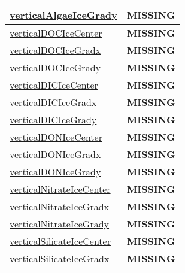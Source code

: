 {\begin{center}
\begin{longtable}{| p{2.0in} | p{4.0in} |}
    \hline
    \hyperref[subsec:var_sec_tracer_reconstruction_verticalAlgaeIceGrady]{verticalAlgaeIceGrady} & {\bf \color{red} MISSING} \\
    \hline
    \hyperref[subsec:var_sec_tracer_reconstruction_verticalDOCIceCenter]{verticalDOCIceCenter} & {\bf \color{red} MISSING} \\
    \hline
    \hyperref[subsec:var_sec_tracer_reconstruction_verticalDOCIceGradx]{verticalDOCIceGradx} & {\bf \color{red} MISSING} \\
    \hline
    \hyperref[subsec:var_sec_tracer_reconstruction_verticalDOCIceGrady]{verticalDOCIceGrady} & {\bf \color{red} MISSING} \\
    \hline
    \hyperref[subsec:var_sec_tracer_reconstruction_verticalDICIceCenter]{verticalDICIceCenter} & {\bf \color{red} MISSING} \\
    \hline
    \hyperref[subsec:var_sec_tracer_reconstruction_verticalDICIceGradx]{verticalDICIceGradx} & {\bf \color{red} MISSING} \\
    \hline
    \hyperref[subsec:var_sec_tracer_reconstruction_verticalDICIceGrady]{verticalDICIceGrady} & {\bf \color{red} MISSING} \\
    \hline
    \hyperref[subsec:var_sec_tracer_reconstruction_verticalDONIceCenter]{verticalDONIceCenter} & {\bf \color{red} MISSING} \\
    \hline
    \hyperref[subsec:var_sec_tracer_reconstruction_verticalDONIceGradx]{verticalDONIceGradx} & {\bf \color{red} MISSING} \\
    \hline
    \hyperref[subsec:var_sec_tracer_reconstruction_verticalDONIceGrady]{verticalDONIceGrady} & {\bf \color{red} MISSING} \\
    \hline
    \hyperref[subsec:var_sec_tracer_reconstruction_verticalNitrateIceCenter]{verticalNitrateIceCenter} & {\bf \color{red} MISSING} \\
    \hline
    \hyperref[subsec:var_sec_tracer_reconstruction_verticalNitrateIceGradx]{verticalNitrateIceGradx} & {\bf \color{red} MISSING} \\
    \hline
    \hyperref[subsec:var_sec_tracer_reconstruction_verticalNitrateIceGrady]{verticalNitrateIceGrady} & {\bf \color{red} MISSING} \\
    \hline
    \hyperref[subsec:var_sec_tracer_reconstruction_verticalSilicateIceCenter]{verticalSilicateIceCenter} & {\bf \color{red} MISSING} \\
    \hline
    \hyperref[subsec:var_sec_tracer_reconstruction_verticalSilicateIceGradx]{verticalSilicateIceGradx} & {\bf \color{red} MISSING} \\

\end{longtable}
\end{center}}
